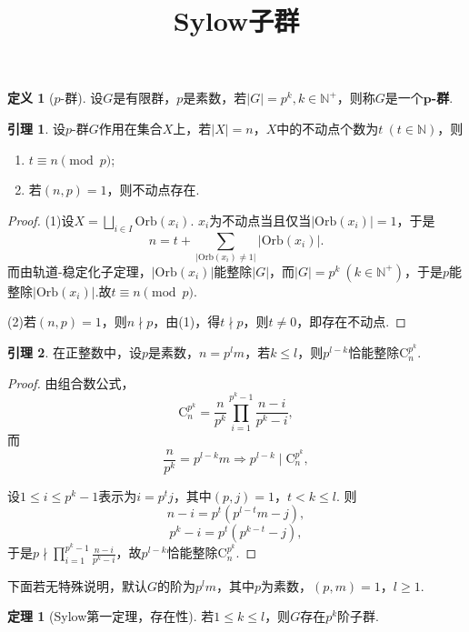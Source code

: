 \documentclass[12pt]{ctexart}
\title{\vspace{-2em}\textbf{Sylow子群}\vspace{-2em}}
\date{ }
\theoremstyle{definition}
\newtheorem{definition}{定义}
\newtheorem{theorem}{定理}
\newtheorem{lemma}{引理}
\theoremstyle{plain}
\newcommand{\Orb}{\mathrm{Orb}}
\begin{document}
	\maketitle
	\begin{definition}[$p$-群]
		设$G$是有限群，$p$是素数，若$|G|=p^k,k\in\mathbb{N}^+$，则称$G$是一个$\boldsymbol{p}$\textbf{-群}.
	\end{definition}
	\begin{lemma}\label{fixedpoint}
		设$p$-群$G$作用在集合$X$上，若$|X|=n$，$X$中的不动点个数为$t\ (t\in\mathbb{N})$，则
		\begin{enumerate}[(1)]
			\item $t\equiv n\pmod p$;
			\item 若$(n,p)=1$，则不动点存在.
		\end{enumerate}
	\end{lemma}
	\begin{proof}
		(1)设$X=\displaystyle\bigsqcup_{i\in I}\Orb(x_i)$. $x_i$为不动点当且仅当$|\Orb(x_i)|=1$，于是
		$$n=t+\sum_{|\Orb(x_i)\neq 1|}|\Orb(x_i)|.$$
		而由轨道-稳定化子定理，$|\Orb(x_i)|$能整除$|G|$，而$|G|=p^k\ (k\in\mathbb{N}^{+})$，于是$p$能整除$|\Orb(x_i)|$.故$t\equiv n\pmod p$.
		
		(2)若$(n,p)=1$，则$n\nmid p$，由(1)，得$t\nmid p$，则$t\neq 0$，即存在不动点.
	\end{proof}
	\begin{lemma}\label{divide}
		在正整数中，设$p$是素数，$n=p^lm$，若$k\leqslant l$，则$p^{l-k}$恰能整除$\mathrm{C}_{n}^{p^k}$.
	\end{lemma}
	\begin{proof}
		由组合数公式，
		$$\mathrm{C}_{n}^{p^k}=\frac{n}{p^k}\prod_{i=1}^{p^k-1}\frac{n-i}{p^k-i},$$
		而
		$$\frac{n}{p^k}=p^{l-k}m\Rightarrow p^{l-k}\mid\mathrm{C}_{n}^{p^k},$$
		
		设$1\leqslant i\leqslant p^k-1$表示为$i=p^tj$，其中$(p,j)=1$，$t<k\leqslant l$. 则
		$$n-i=p^t\left(p^{l-t}m-j\right),$$
		$$p^{k}-i=p^t\left(p^{k-t}-j\right),$$
		于是$p\nmid\prod_{i=1}^{p^k-1}\frac{n-i}{p^k-i}$，故$p^{l-k}$恰能整除$\mathrm{C}_{n}^{p^k}$.
	\end{proof}
	下面若无特殊说明，默认$G$的阶为$p^lm$，其中$p$为素数，$(p,m)=1$，$l\geqslant 1$.
	\begin{theorem}[Sylow第一定理，存在性]
		若$1\leqslant k\leqslant l$，则$G$存在$p^k$阶子群.
	\end{theorem}
\end{document}
